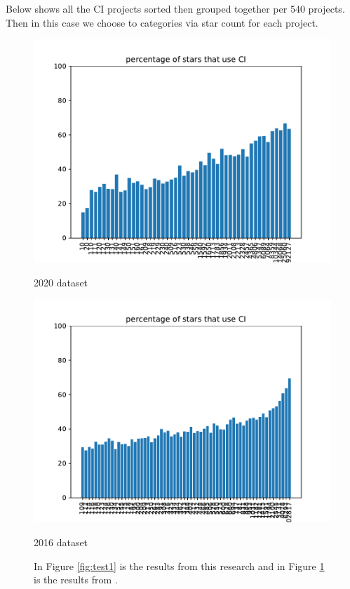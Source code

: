 \documentclass[twoside,12pt,titlepage,a4paper]{article}
\begin{document}
Below shows all the CI projects sorted then grouped together per 540 projects. Then in this case we choose to categories via star count for each project. 

\begin{figure}[!htbp]
  \centering
  \begin{minipage}{.48\textwidth}
    \centering
    \includegraphics[width=.9\textwidth]{../src/results/percentage stars with CI.pdf}
    \caption{2020 dataset}
    \label{fig:test1}
  \end{minipage}%
  \hfill
  \begin{minipage}{.48\textwidth}
    \centering
    \includegraphics[width=.9\textwidth]{../src/results/percentage sub with CI other paper source.pdf}
    \caption[]{2016 dataset}
    \label{fig:test2}
  \end{minipage}
  \caption{In Figure \ref{fig:test1} is the results from this research and in Figure \ref{fig:test2} is the results from \cite{Hilton2016}.
  }
\end{figure}
\end{document}
